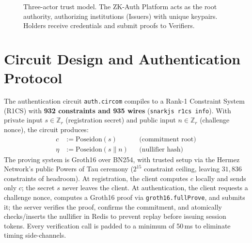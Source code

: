 \documentclass[12pt,a4paper,oneside]{report}
\begin{document}
\begin{figure}[H]
\centering
{}
\caption{Three-actor trust model. The ZK-Auth Platform acts as the root authority, authorizing institutions (Issuers) with unique keypairs. Holders receive credentials and submit proofs to Verifiers.}
\label{fig:trust_model}
\end{figure}

\section{Circuit Design and Authentication Protocol}

The authentication circuit \texttt{auth.circom} compiles to a Rank-1
Constraint System (R1CS) with \textbf{932 constraints and 935 wires}
(\texttt{snarkjs r1cs info}). With private input $s \in \mathbb{Z}_r$
(registration secret) and public input $n \in \mathbb{Z}_r$ (challenge
nonce), the circuit produces:
\begin{align}
  c &:= \text{Poseidon}(s) &&\text{(commitment root)} \\
  \eta &:= \text{Poseidon}(s \| n) &&\text{(nullifier hash)}
\end{align}
The proving system is Groth16 over BN254, with trusted setup via the
Hermez Network's public Powers of Tau ceremony ($2^{15}$ constraint
ceiling, leaving $31{,}836$ constraints of headroom). At registration, the
client computes $c$ locally and sends only $c$; the secret $s$ never
leaves the client. At authentication, the client requests a challenge
nonce, computes a Groth16 proof via \texttt{groth16.fullProve}, and
submits it; the server verifies the proof, confirms the commitment, and
atomically checks/inserts the nullifier in Redis to prevent replay before
issuing session tokens. Every verification call is padded to a minimum of
50\,ms to eliminate timing side-channels.
\end{document}
